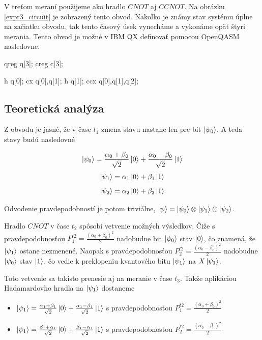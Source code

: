 V treťom meraní použijeme ako hradlo \(CNOT\) aj \(CCNOT\). Na obrázku 
\ref{expr3_circuit} je zobrazený tento obvod. Nakoľko je známy stav systému
úplne na začiatku obvodu, tak tento časový úsek vynecháme a vykonáme opäť
štyri merania. Tento obvod je možné v IBM QX definovať pomocou OpenQASM 
nasledovne.
\begin{code}
qreg q[3];
creg c[3];

h q[0];
cx q[0],q[1];
h q[1];
ccx q[0],q[1],q[2];
\end{code}


\subsection*{Teoretická analýza}
Z obvodu je jasné, že v čase \(t_1\) zmena stavu nastane len pre bit 
\(\ket{\psi_0}\). A teda stavy budú nasledovné

\[\ket{\psi_0} = \frac{\alpha_0 + \beta_0}{\sqrt{2}}\ket{0} + \frac{\alpha_0 - \beta_0}{\sqrt{2}}\ket{1}\]
\[\ket{\psi_1} = \alpha_1\ket{0} + \beta_1\ket{1}\]
\[\ket{\psi_2} = \alpha_2\ket{0} + \beta_2\ket{1}\]

Odvodenie pravdepodobností je potom triviálne, 
\(\ket{\psi} = \ket{\psi_0} \otimes \ket{\psi_1} \otimes \ket{\psi_2}\).

Hradlo \(CNOT\) v čase \(t_2\) spôsobí vetvenie možných výsledkov. Čiže s 
pravdepodobnosťou \(P^{t2}_1 = \frac{(\alpha_0 + \beta_0)^2}{2}\) nadobudne
bit \(\ket{\psi_0}\) stav \(\ket{0}\), čo znamená, že \(\ket{\psi_1}\) ostane
nezmenené. Naopak s pravdepodobnosťou 
\(P^{t2}_2 = \frac{(\alpha_0 - \beta_0)^2}{2}\) nadobudne \(\ket{\psi_0}\) 
stav \(\ket{1}\), čo vedie k preklopeniu kvantového bitu \(\ket{\psi_1}\) na
\(X\ket{\psi_1}\).

Toto vetvenie sa takisto prenesie aj na meranie v čase \(t_3\). Takže 
aplikáciou Hadamardovho hradla na \(\ket{\psi_1}\) dostaneme
\begin{itemize}
    \item[] \(\ket{\psi_1} = \frac{\alpha_1 + \beta_1}{\sqrt{2}}\ket{0} + \frac{\alpha_1 - \beta_1}{\sqrt{2}}\ket{1}\) s pravdepodobnosťou  \(P^{t2}_1 = \frac{(\alpha_0 + \beta_0)^2}{2}\)

    \item[] \(\ket{\psi_1} = \frac{\beta_1 + \alpha_1}{\sqrt{2}}\ket{0} + \frac{\beta_1 - \alpha_1}{\sqrt{2}}\ket{1}\) s pravdepodobnosťou  \(P^{t2}_2 = \frac{(\alpha_0 - \beta_0)^2}{2}\)
\end{itemize} 

